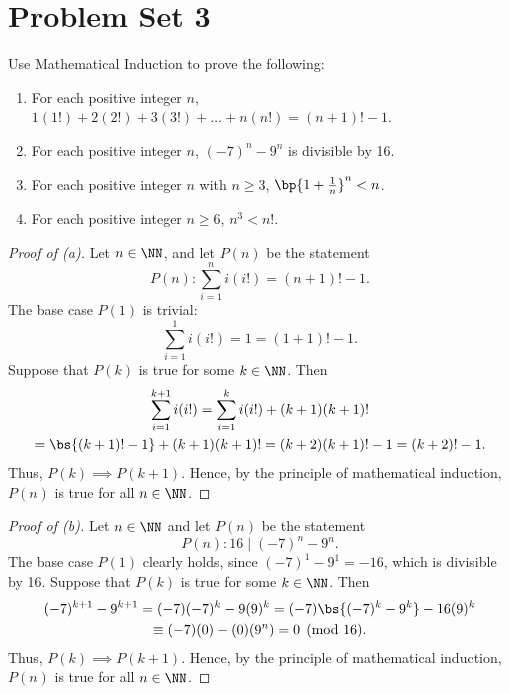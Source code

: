 \section{Problem Set 3}

\begin{problem}
    Use Mathematical Induction to prove the following:

    \begin{enumerate}
        \item For each positive integer $n$, $1(1!) + 2(2!) + 3(3!) + \dots + n(n!) = (n+1)! - 1$.
        \item For each positive integer $n$, $(-7)^n - 9^n$ is divisible by 16.
        \item For each positive integer $n$ with $n \geq 3$, $\bp{1 + \frac1n}^n < n$.
        \item For each positive integer $n \geq 6$, $n^3 < n!$.
    \end{enumerate}
\end{problem}
\begin{proof}[Proof of \emph{(a)}]
    Let $n \in \NN$, and let $P(n)$ be the statement \[P(n) : \sum_{i = 1}^{n} i (i!) = (n+1)! - 1.\] The base case $P(1)$ is trivial: \[\sum_{i = 1}^1 i(i!) = 1 = (1 + 1)! - 1.\] Suppose that $P(k)$ is true for some $k \in \NN$. Then
    \begin{gather*}
        \sum_{i = 1}^{k+1} i(i!) = \sum_{i = 1}^k i(i!) + (k+1)(k+1)!\\
        = \bs{(k+1)! - 1} + (k+1)(k+1)! = (k+2)(k+1)! - 1 = (k+2)! - 1.
    \end{gather*}
    Thus, $P(k) \implies P(k+1)$. Hence, by the principle of mathematical induction, $P(n)$ is true for all $n \in \NN$.
\end{proof}
\begin{proof}[Proof of \emph{(b)}]
    Let $n \in \NN$ and let $P(n)$ be the statement \[P(n): 16 \mid (-7)^n - 9^n.\] The base case $P(1)$ clearly holds, since $(-7)^1 - 9^1 = -16$, which is divisible by 16. Suppose that $P(k)$ is true for some $k \in \NN$. Then
    \begin{gather*}
        (-7)^{k+1} - 9^{k+1} = (-7) (-7)^k - 9 (9)^k = (-7) \bs{(-7)^k - 9^k} - 16(9)^k\\
        \equiv (-7)(0) - (0)(9^n) = 0 \pmod{16}.
    \end{gather*}
    Thus, $P(k) \implies P(k+1)$. Hence, by the principle of mathematical induction, $P(n)$ is true for all $n \in \NN$.
\end{proof}
